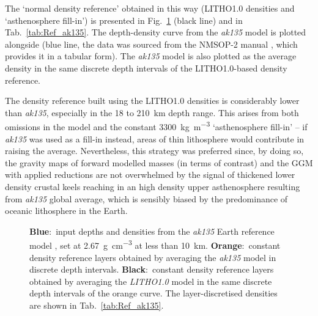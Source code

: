 The `normal density reference' obtained in this way ({LITHO1.0} densities and `asthenosphere fill-in') is presented in Fig.~\ref{fig:SigIs:Ref_ak135} (black line) and in Tab.~\ref{tab:Ref_ak135}.
The depth-density curve from the \textit{ak135} model \parencites{Kennett1995_ak135}{Montagner1996} is plotted alongside (blue line, the data was sourced from the {NMSOP-2} manual \cite{Bormann2002}, which provides it in a tabular form).
The \textit{ak135} model is also plotted as the average density in the same discrete depth intervals of the LITHO1.0-based density reference.

The density reference built using the {LITHO1.0} densities is considerably lower than \textit{ak135}, especially in the \num{18} to \SI{210}{\kilo \metre} depth range.
This arises from both omissions in the model and the constant \SI{3300}{\kilo \gram \per \cubic \metre} `asthenosphere fill-in' -- if \textit{ak135} was used as a fill-in instead, areas of thin lithosphere would contribute in raising the average.
Nevertheless, this strategy was preferred since, by doing so, the gravity maps of forward modelled masses (in terms of contrast) and the GGM with applied reductions are not overwhelmed by the signal of thickened lower density crustal keels reaching in an high density upper asthenosphere resulting from \textit{ak135} global average, which is sensibly biased by the predominance of oceanic lithosphere in the Earth. 

\begin{figure}
    \begin{adjustbox}{center}
    \end{adjustbox}
    \caption[Depths and densities from the \textit{ak135} reference model, original,layer-discretised and computed on {LITHO1.0} data.]{
        \textbf{Blue}:~input depths and densities from the \textit{ak135} Earth reference model \parencite{Kennett1995_ak135}, set at \SI{2.67}{\gram \per \cubic \centi \metre} at less than \SI{10}{\kilo \metre}.
        \textbf{Orange}:~constant density reference layers obtained by averaging the \textit{ak135} model in discrete depth intervals.
        \textbf{Black}:~constant density reference layers obtained by averaging the \textit{LITHO1.0} \parencite{Pasyanos2014} model in the same discrete depth intervals of the orange curve.
        The layer-discretised densities are shown in Tab.~\ref{tab:Ref_ak135}.}
    \label{fig:SigIs:Ref_ak135}
\end{figure}

